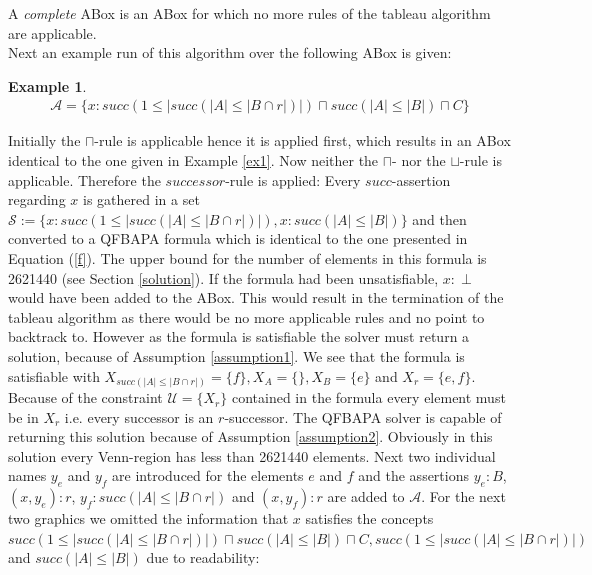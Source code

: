 \documentclass{book}
\theoremstyle{break}
\theoremstyle{definition}
\newtheorem{ex}{Example}
\begin{document}
A \textit{complete} ABox is an ABox for which no more rules of the tableau algorithm are applicable.\\
Next an example run of this algorithm over the following ABox is given:
\begin{ex}
\begin{align*}
\mathcal{A}=\{x:succ(1\leq|succ(|A|\leq|B\cap r|)|)\sqcap succ(|A|\leq |B|)\sqcap C\}
\end{align*}
\end{ex}
Initially the $\sqcap$-rule is applicable hence it is applied first, which results in an ABox identical to the one given in Example \ref{ex1}. Now neither the $\sqcap$- nor the $\sqcup$-rule is applicable. Therefore the $successor$-rule is applied: Every $succ$-assertion regarding $x$ is gathered in a set $\mathcal{S}:=\{x:succ(1\leq|succ(|A|\leq|B\cap r|)|), x:succ(|A|\leq |B|)\}$ and then converted to a QFBAPA formula which is identical to the one presented in Equation (\ref{f}). The upper bound for the number of elements in this formula is 2621440 (see Section \ref{solution}). If the formula had been unsatisfiable, $x:\perp$ would have been added to the ABox. This would result in the termination of the tableau algorithm as there would be no more applicable rules and no point to backtrack to. However as the formula is satisfiable the solver must return a solution, because of Assumption \ref{assumption1}. We see that the formula is satisfiable with $X_{succ(|A|\leq |B\cap r|)}=\{f\},X_A=\{\},X_B=\{e\}$ and $X_r=\{e,f\}$. Because of the constraint $\mathcal{U}=\{X_r\}$ contained in the formula every element must be in $X_r$ i.e. every successor is an $r$-successor. The QFBAPA solver is capable of returning this solution because of Assumption \ref{assumption2}. Obviously in this solution every Venn-region has less than 2621440 elements. Next two individual names $y_e$ and $y_f$ are introduced for the elements $e$ and $f$ and the assertions $y_e:B$, $(x,y_e):r$, $y_f:succ(|A|\leq|B\cap r|)$ and $(x,y_f):r$ are added to $\mathcal{A}$. For the next two graphics we omitted the information that $x$ satisfies the concepts $succ(1\leq|succ(|A|\leq|B\cap r|)|)\sqcap succ(|A|\leq |B|)\sqcap C, succ(1\leq|succ(|A|\leq|B\cap r|)|)$ and $succ(|A|\leq |B|)$ due to readability:
\begin{figure}[H]
\centering
{}
\end{figure}
\end{document}
